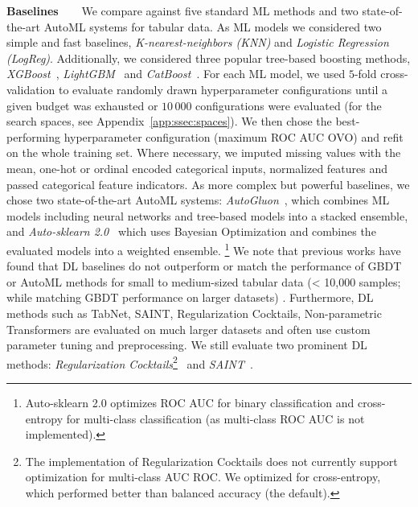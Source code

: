 \documentclass{article}
\newcommand{\slimparagraph}[1]{\textbf{#1~~~}}
\begin{document}
\slimparagraph{Baselines} We compare against five standard ML methods and two state-of-the-art AutoML systems for tabular data.
As ML models we considered two simple and fast baselines, \textit{K-nearest-neighbors (KNN)} and \textit{Logistic Regression (LogReg)}. Additionally, we considered
three popular tree-based boosting methods, \textit{XGBoost}~\citep{chen-arxiv20a}, \textit{LightGBM}~\citep{ke-neurips17a} and \textit{CatBoost}~\citep{prokhorenkova-neurips18a}.
For each ML model, we used $5$-fold cross-validation to evaluate randomly drawn hyperparameter configurations until a given budget was exhausted or $10\,000$ configurations were evaluated (for the search spaces, see Appendix~\ref{app:ssec:spaces}).
We then chose the best-performing hyperparameter configuration (maximum ROC AUC OVO) and refit on the whole training set. Where necessary, we imputed missing values with the mean, one-hot or ordinal encoded categorical inputs, normalized features and passed categorical feature indicators.
As more complex but powerful baselines, we chose two state-of-the-art AutoML systems: \textit{AutoGluon}~\citep{erickson-arxiv20a}, which combines ML models including neural networks and tree-based models into a stacked ensemble, and \textit{Auto-sklearn 2.0}~\citep{feurer-nips15a,feurer-arxiv20v2} which uses Bayesian Optimization and combines the evaluated models into a weighted ensemble.%
\footnote{Auto-sklearn 2.0 optimizes ROC AUC for binary classification and cross-entropy for multi-class classification (as multi-class ROC AUC is not implemented).
}
We note that previous works have found that DL baselines do not outperform or match the performance of GBDT or AutoML methods for small to medium-sized tabular data (< 10,000 samples; while matching GBDT performance on larger datasets) \citep{nnsfortabular,grinsztajn2022why,nnsfortabular2}. Furthermore, DL methods such as TabNet, SAINT, Regularization Cocktails, Non-parametric Transformers \citep{arik2021tabnet, somepalli2021saint, regcocktail, kossen2021self} are evaluated on much larger datasets and often use custom parameter tuning and preprocessing.
We still evaluate two prominent DL methods: \textit{Regularization Cocktails}\footnote{The implementation of Regularization Cocktails does not currently support optimization for multi-class AUC ROC. We optimized for cross-entropy, which performed better than balanced accuracy (the default).}~\citep{regcocktail} and \textit{SAINT}~\citep{somepalli2021saint}.
\end{document}
